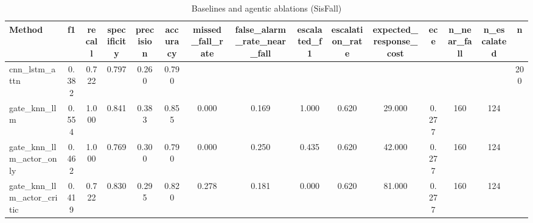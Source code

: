 \begin{table}[t]
\centering
\caption{Baselines and agentic ablations (SisFall)}
\begin{tabular}{lcccccccccccccc}
\toprule
Method & f1 & recall & specificity & precision & accuracy & missed_fall_rate & false_alarm_rate_near_fall & escalated_f1 & escalation_rate & expected_response_cost & ece & n_near_fall & n_escalated & n \\
\midrule
cnn_lstm_attn & 0.382 & 0.722 & 0.797 & 0.260 & 0.790 &  &  &  &  &  &  &  &  & 200 \\
gate_knn_llm & 0.554 & 1.000 & 0.841 & 0.383 & 0.855 & 0.000 & 0.169 & 1.000 & 0.620 & 29.000 & 0.277 & 160 & 124 &  \\
gate_knn_llm_actor_only & 0.462 & 1.000 & 0.769 & 0.300 & 0.790 & 0.000 & 0.250 & 0.435 & 0.620 & 42.000 & 0.277 & 160 & 124 &  \\
gate_knn_llm_actor_critic & 0.419 & 0.722 & 0.830 & 0.295 & 0.820 & 0.278 & 0.181 & 0.000 & 0.620 & 81.000 & 0.277 & 160 & 124 &  \\
\bottomrule
\end{tabular}
\end{table}